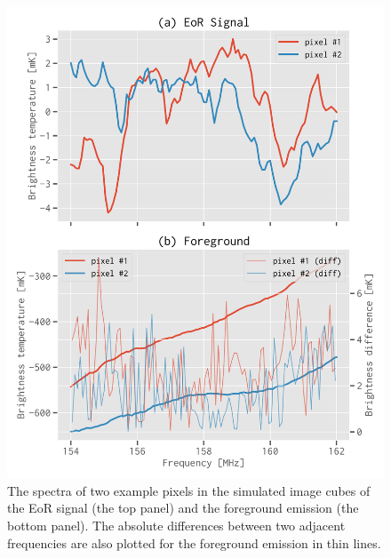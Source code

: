 \documentclass[letters,a4paper,fleqn,usenatbib]{mnras}
\begin{document}
\begin{figure}
  \centering
  \includegraphics[width=\columnwidth]{simudata}
  \caption{\label{fig:simudata}%
    The spectra of two example pixels in the simulated image cubes
    of the EoR signal (the top panel) and the foreground emission
    (the bottom panel).
    The absolute differences between two adjacent frequencies are
    also plotted for the foreground emission in thin lines.
  }
\end{figure}
\end{document}
